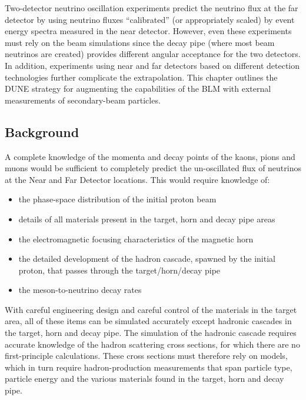 Two-detector neutrino oscillation experiments 
predict the neutrino flux at the far detector by using neutrino fluxes ``calibrated'' (or
appropriately scaled) by event energy spectra measured in the near detector. However, even
these experiments must rely on the beam simulations since the decay pipe (where most beam
neutrinos are created) provides different angular acceptance for the two detectors. In addition, 
experiments using near and far detectors based on different detection technologies further complicate the extrapolation. This chapter outlines the DUNE strategy for augmenting the capabilities of the BLM with
external measurements of secondary-beam particles. 

\subsection{Background}

A complete knowledge of the momenta and decay points of the kaons, pions and
muons would be sufficient to completely predict the un-oscillated flux of neutrinos
at the Near and Far Detector locations. This would require knowledge of:

\begin{itemize}
\item the phase-space distribution of the initial proton beam
\item details of all materials present in the target, horn and decay pipe areas
\item  the electromagnetic focusing characteristics of the magnetic horn
\item the detailed development of the hadron cascade, spawned by the
initial proton, that passes through the target/horn/decay pipe
\item the meson-to-neutrino decay rates
\end{itemize}

With careful engineering design and careful control of the materials in the target
area, all of these items can be simulated accurately except hadronic cascades in
the target, horn and decay pipe. The simulation of the hadronic cascade requires
accurate knowledge of the hadron scattering cross sections, for which there are no
first-principle calculations. These cross sections must therefore rely on models, which
in turn require hadron-production measurements that span particle type, particle
energy and the various materials found in the target, horn and decay pipe.

